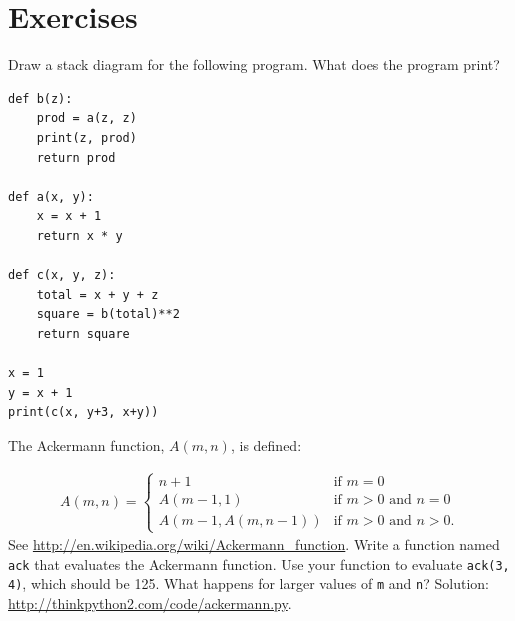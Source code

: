 \documentclass[10pt]{book}
\begin{document}
\section{Exercises}

\begin{exercise}

Draw a stack diagram for the following program.  What does the program print?

\begin{verbatim}
def b(z):
    prod = a(z, z)
    print(z, prod)
    return prod

def a(x, y):
    x = x + 1
    return x * y

def c(x, y, z):
    total = x + y + z
    square = b(total)**2
    return square

x = 1
y = x + 1
print(c(x, y+3, x+y))
\end{verbatim}

\end{exercise}


\begin{exercise}
\label{ackermann}

The Ackermann function, $A(m, n)$, is defined:

\begin{eqnarray*}
A(m, n) = \begin{cases}
              n+1 & \mbox{if } m = 0 \\
        A(m-1, 1) & \mbox{if } m > 0 \mbox{ and } n = 0 \\
A(m-1, A(m, n-1)) & \mbox{if } m > 0 \mbox{ and } n > 0.
\end{cases}
\end{eqnarray*}
%
See \url{http://en.wikipedia.org/wiki/Ackermann_function}.
Write a function named {\tt ack} that evaluates the Ackermann function.
Use your function to evaluate {\tt ack(3, 4)}, which should be 125.
What happens for larger values of {\tt m} and {\tt n}?
Solution: \url{http://thinkpython2.com/code/ackermann.py}.

\end{exercise}
\end{document}
